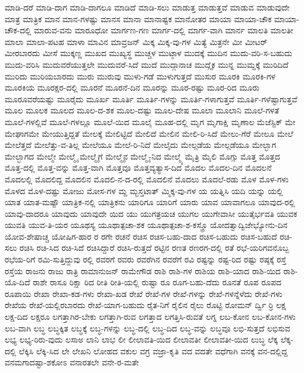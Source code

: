 {ಮಾಡಿ-ದರೆ
ಮಾಡಿ-ದಾಗ
ಮಾಡಿ-ದಾಗಲೂ
ಮಾಡಿದೆ
ಮಾಡಿ-ಸಲು
ಮಾಡುತ್ತ
ಮಾಡುತ್ತವೆ
ಮಾಡುವ
ಮಾಡುವುದೇ
ಮಾತ್ರ
ಮಾತ್ರಿಕ
ಮಾನ
ಮಾನ-ಗಳಷ್ಟು
ಮಾನಸ
ಮಾನಾ
ಮಾನಾಷ್ಟಕ
ಮಾನೋತರ
ಮಾಯಾ
ಮಾಯಾ-ಚೌಕ
ಮಾಯಾ-ಚೌಕ-ದಲ್ಲಿ
ಮಾರುವ-ವನು
ಮಾರೂಧೋ
ಮಾರ್ಗಣ-ಗಣ
ಮಾರ್ಗ-ದಲ್ಲಿ
ಮಾರ್ಗ-ವಾಗಿ
ಮಾರ್ನ
ಮಾಲತಿ
ಮಾಲತೀ
ಮಾಲಾ
ಮಾಲಾ-ಪಟಹ
ಮಾಳಾ
ಮಾವಿನ
ಮಾವ್ರಜನ್
ಮಿಕ್ಕ
ಮಿಕ್ಕ-ವು-ಗಳ
ಮಿತ್ಯೆ
ಮಿತ್ರನೇ
ಮೀ
ಮೀಟರ್
ಮೀರಬಾರದು
ಮೀಸೆ
ಮುಕ್ಕಣ್ಣ
ಮುಖದ
ಮುಖ್ಯಸ್ಥ
ಮುಚ್ಚಳ
ಮುಟ್ಠಾಳ
ಮುದಕ್ಕೆ
ಮುದಿನ
ಮುದು-ವರಿ-ಸ-ಬಹುದು
ಮುದು-ವರಿಸಿ
ಮುದುವರೆಯುತ್ತಲೇ
ಮುದುವರೆ-ಸಿದೆ
ಮುದೆ
ಮುದ್ಗಾನಾಚ
ಮುದ್ಗೈಕ
ಮುನ್ನ
ಮುಮ್ದಕ್ಕೆ
ಮುರಿದಿದೆ
ಮುರಿದು
ಮುರಿಯಬಾರದು
ಮುರು
ಮುರುವು
ಮುಳು-ಗಡೆ
ಮುಳುಗುತ್ತದೆ
ಮುಸುರ
ಮೂರಕಿ
ಮೂರಕಿ-ಗಳ
ಮೂರಕಿಯ
ಮೂರಕ್ಷರ-ದಲ್ಲಿ
ಮೂರನೆ
ಮೂರನೆ-ದಿನ
ಮೂರನ್ನು
ಮೂರ-ರಷ್ಟು
ಮೂರ-ರಿದ
ಮೂರು
ಮೂರೂವರೆಯಷ್ಟು
ಮೂರೈದು
ಮೂರ್ಖ
ಮೂರ್ತಿ
ಮೂರ್ತಿ-ಗಳನ್ನು
ಮೂರ್ತಿ-ಗಳಾಗುತ್ತವೆ
ಮೂರ್ತಿ-ಗಳೆಷ್ಟಾಗುತ್ತವೆ
ಮೂಲ
ಮೂಲಕ
ಮೂಲದ
ಮೂಲ-ದ-ಶಕ
ಮೂಲ-ದಷ್ಟು
ಮೂಲ-ದೇಷ
ಮೂಲಾ
ಮೂಲಾನಿ
ಮೂಲೆ-ಗಳತೆ
ಮೂಲೆ-ಗಳಲ್ಲಿವೆ
ಮೂಲೆ-ಗಳಲ್ಲೂ
ಮೂಲೆ-ಯಿದ
ಮೂಲೈ
ಮೂಹ-ದಲ್ಲಿ
ಮೃಗ
ಮೃಗಾಕ್ಷಿ
ಮೃಣಾಲ
ಮೆಜೆಸ್ಟಿಕ್
ಮೇ
ಮೇಘಾಗಮೇ
ಮೇಯುತ್ತಿದ್ದತೆ
ಮೇಲಕ್ಕೆ
ಮೇಲಿಟ್ಟಿದೆ
ಮೇಲಿದೆ
ಮೇಲಿನ
ಮೇಲಿ-ರಿ-ಸಿದೆ
ಮೇಲು-ಗೆರೆ
ಮೇಲೂ
ಮೇಲೆ
ಮೇಲೆತ್ತದೆ
ಮೇಲೆತ್ತು-ವ-ತಿಲ್ಲ
ಮೇಲೆಯೂ
ಮೇಲೆ-ರಿ-ನಿದೆ
ಮೇಲೈದು
ಮೇಲ್ಗಡೆಯ
ಮೇಲ್ಗಡೆಯೂ
ಮೇಲ್ಭಾಗ
ಮೇಲ್ಭಾಗದ
ಮೇಲ್ಮೇ
ಮೇಲ್ಮೈ
ಮೇಲ್ಮೈಗೆ
ಮೇಲ್ಮೈನ
ಮೇಲ್ಮೈ-ನಿದ
ಮೇಲ್ಮ್ಯೆ
ಮೈತ್ರಿ
ಮೈಲಿ
ಮೊಗ್ಗು
ಮೊತ್ತ
ಮೊತ್ತದ
ಮೊತ್ತ-ದಲ್ಲಿ
ಮೊತ್ತ-ವನ್ನು
ಮೊತ್ತ-ವಾಗಿ
ಮೊತ್ತವೂ
ಮೊತ್ತವ್ಯತ್ಯಾಸ-ದಿದ
ಮೊದಲ
ಮೊದಲ-ದಿನ
ಮೊದಲನೆ
ಮೊದಲಲ್ಲಿ
ಮೊದಲಿದ್ದ
ಮೊದಲಿನ
ಮೊದಲಿ-ನ-ದ-ರಲ್ಲಿ
ಮೊದಲಿನೆ
ಮೊದಲು
ಮೊದಲೆ-ರಡು
ಮೊಳ
ಮೊಳ-ಗಳು
ಮೊಳದ
ಮೊಳ-ದಷ್ಟು
ಮೋಜು
ಮೋಸ-ಗಳ
ಮ್ದ
ಮ್ಭಸ್ತಟಾತ್
ಮ್ಮಿಕ್ಕ-ವು-ಗಳ
ಯ
ಯತ್ನಿಸಿ
ಯದಿ
ಯನ್ನು
ಯಲ್ಲಿ
ಯಾತ
ಯಾತ-ಮಷ್ಟೌ
ಯಾತ್ರಿಕ-ನಲ್ಲಿ
ಯಾತ್ರಿಕನು
ಯಾರಿಗೂ
ಯಾರಿಗೆ
ಯಾರು
ಯಾವ
ಯಾವಾಗಲೂ
ಯಾವುದ-ರಲ್ಲಿ
ಯಾವು-ದಾದರೂ
ಯಾವುದು
ಯಾವುದೇ
ಯಿದ
ಯು
ಯುಗತ್ರಯಚ
ಯುಗಲ
ಯುಗೇವಾಸೀ
ಯುತೈರ್ಭವತಿ
ಯುವಕ
ಯುವತಿ
ಯುವ-ತಿ-ಯರ
ಯೂಥಸ್ಯ
ಯೂಥಾತ್ಪಚಾ-ಶಕ
ಯೂಥಾತ್ಪಚಾ-ಶ-ಕಸ್ತ್ರೊ
ಯೋದತ್ವಾದ್ವಿಜೇಭ್ಯೋನು-ದಿನ
ಯೋವ-ಶೇಷಾಚ್ಚ
ಯೋಷಿಗ-ಹಾರ
ರ
ರಗೇ
ರಚನೆ
ರಚಿಸ
ರಚಿಸ-ಬಹು-ದಾದ
ರಚಿಸ-ಬಹುದು
ರಚಿಸ-ಬಹುದೆ
ರಚಿ-ಸಲು
ರಚಿಸಿ
ರಚಿ-ಸಿದ
ರಚಿ-ಸಿದೆ
ರಚಿಸಿದ್ದಾರೆ
ರಚಿಸಿ-ರುತ್ತದೆ
ರಟ್ಟಿನ
ರಣತ
ರಣರಗ-ದಲ್ಲಿ
ರತೆ
ರಭೆ-ಯರಿಗವನೊಬ್ಬ
ರಭೆಯ-ರಿಗೆ
ರಮಿ-ಸುತ್ತಿದ್ದುವು
ರಲ್ಲಿ
ರವರಗೆ
ರವರು
ರವರೆಗಿನ
ರವರೆಗೆ
ರವಿ
ರಷ್ಟನ್ನು
ರಷ್ಟ-ರಿದ
ರಷ್ಟು
ರಷ್ಠಕ್ಕೆ
ರಸ್ತೆ
ರಸ್ತೆಯ
ರಾಜನು
ರಾಜು
ರಾತ್ರಿ
ರಾಮಾನುಜನ್
ರಾಮೇಗೌಡ
ರಾಶಿ
ರಾಶಿ-ಗಳ
ರಾಶಿಯ
ರಾಶಿ-ಯಾದ
ರಾಶಿ-ಯಿದ
ರಾಶಿ-ಯೊ-ದಿದೆ
ರಾಶೇ
ರಾಸೂ
ರಿಕ್ಷಾ
ರಿದ
ರೀತಿ
ರೀತಿ-ಯಲ್ಲಿ
ರುಷ್ಟಾ
ರೂ
ರೂಗ-ಬಹು-ದೆದು
ರೂನತೆ
ರೂಪ
ರೂಪದ
ರೂಪಾಯಿ
ರೇಖಾ
ರೇಖಾ-ಕಡ-ಗಳು
ರೇಖಾ-ಖಡ
ರೇಖೆ
ರೇಖೆ-ಗಳ
ರೇಖೆ-ಗಳನ್ನು
ರೇಖೆ-ಗಳನ್ನೆಳೆದು
ರೇಖೆ-ಗಳು
ರೇಖೆಯ
ರೇಖೆ-ಯಲ್ಲಿರಬಾರದು
ರೇಖೆ-ಯಾಗ-ಬಹುದು
ರೈತ-ನಿಗೆ
ರೈಲಿನ
ರೈಲು
ರೊಟ್ಟಿ
ರೋಮನ್
ರ್ದ್ವಿ
ರ್ರಿ
ಲಕ್ಷ
ಲಕ್ಷ-ದಿದ
ಲಕ್ಷರೂ
ಲಗತ್ತಾಗಿರ-ಬೇಕು
ಲಗತ್ತಾಗಿ-ರುವ
ಲಗತ್ತಾದ
ಲಗತ್ತಿಸಿ-ರುವತೆ
ಲಗ್ನ
ಲಬ-ಕೋನ
ಲಬ-ಕೋನ-ಗಳು
ಲಬ-ವಾಗಿ
ಲಬ್ಧ
ಲಬ್ಧಕ್ಕಿತ
ಲಬ್ಧಕ್ಕೆ
ಲಬ್ಧ-ಗಳನ್ನು
ಲಬ್ಧ-ದಲ್ಲಿ
ಲಬ್ಧ-ದಿದ
ಲಬ್ಧ-ವನ್ನು
ಲಬ್ಧವೂ
ಲಭಿ-ಸುತ್ತದೆ
ಲಭಿಸುವ
ಲಭ್ಯ
ಲಭ್ಯ-ರಿರು-ವುದು
ಲಸಾಅ
ಲಾನಿ
ಲಾಭ
ಲೀ
ಲೀಲಾವತಿ-ಯಿದ
ಲೀಲಾವತೀ
ಲೀಲಾವತೀ-ಯಿದ
ಲುಬ್ಧ
ಲೆಕ್ಕ
ಲೆಕ್ಕ-ದಲ್ಲಿ
ಲೆಕ್ಕಿಸಿ
ಲೆಕ್ಕಿ-ಸಿದ
ಲೇ
ಲೇಖನಿ
ಲೋಹದ
ವಕುಲ
ವಗ್ರ
ವಜ್ರಾ-ಕೃತಿ
ವದ
ವದತೇ
ವಧೆಗಾಗಿ
ವನಕ್ಕೆ
ವನ-ದಲ್ಲಿದ್ದ
ವನಮಗಾದಷ್ಟಾ-ಶಕೋಽ
ವನಾರತಲೇ
ವನೇ-ರ-ಮತೇ
}
